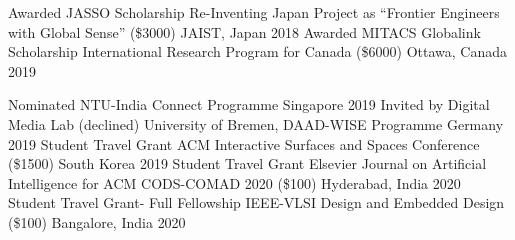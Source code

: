 



\begin{cvhonors}


  \cvhonor
    {Awarded JASSO Scholarship} %
    {Re-Inventing Japan Project as ``Frontier Engineers with Global Sense'' (\$3000)} %
    {JAIST, Japan} %
    {2018} %
  \cvhonor
    {Awarded MITACS Globalink Scholarship} %
    {International Research Program for Canada (\$6000)} %
    {Ottawa, Canada} %
    {2019} %

  \cvhonor
    {Nominated} %
    {NTU-India Connect Programme} %
    {Singapore} %
    {2019} %
  \cvhonor
    {Invited by Digital Media Lab (declined)} %
    {University of Bremen, DAAD-WISE Programme} %
    {Germany} %
    {2019} %
  \cvhonor
    {Student Travel Grant} %
    {ACM Interactive Surfaces and Spaces Conference (\$1500)}%
    {South Korea} %
    {2019} %
  \cvhonor
    {Student Travel Grant} %
    {Elsevier Journal on Artificial Intelligence for ACM CODS-COMAD 2020 (\$100)} %
    {Hyderabad, India} %
    {2020} %
  \cvhonor
    {Student Travel Grant- Full Fellowship} %
    {IEEE-VLSI Design and Embedded Design (\$100)} %
    {Bangalore, India} %
    {2020} %
\end{cvhonors}




